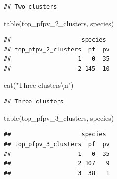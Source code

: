 \documentclass[
  11pt,
  oneside]{book}
\newenvironment{Shaded}{\begin{snugshade}}{\end{snugshade}}
\newcommand{\FunctionTok}[1]{\textcolor[rgb]{0.00,0.00,0.00}{#1}}
\newcommand{\NormalTok}[1]{#1}
\newcommand{\SpecialCharTok}[1]{\textcolor[rgb]{0.00,0.00,0.00}{#1}}
\newcommand{\StringTok}[1]{\textcolor[rgb]{0.31,0.60,0.02}{#1}}
\begin{document}
\begin{verbatim}
## Two clusters
\end{verbatim}

\begin{Shaded}
\begin{Highlighting}[]
\FunctionTok{table}\NormalTok{(top\_pfpv\_2\_clusters, species)}
\end{Highlighting}
\end{Shaded}

\begin{verbatim}
##                    species
## top_pfpv_2_clusters  pf  pv
##                   1   0  35
##                   2 145  10
\end{verbatim}

\begin{Shaded}
\begin{Highlighting}[]
\FunctionTok{cat}\NormalTok{(}\StringTok{"Three clusters}\SpecialCharTok{\textbackslash{}n}\StringTok{"}\NormalTok{)}
\end{Highlighting}
\end{Shaded}

\begin{verbatim}
## Three clusters
\end{verbatim}

\begin{Shaded}
\begin{Highlighting}[]
\FunctionTok{table}\NormalTok{(top\_pfpv\_3\_clusters, species)}
\end{Highlighting}
\end{Shaded}

\begin{verbatim}
##                    species
## top_pfpv_3_clusters  pf  pv
##                   1   0  35
##                   2 107   9
##                   3  38   1
\end{verbatim}
\end{document}
